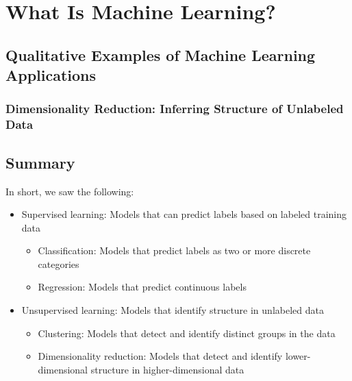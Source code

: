 \chapter{What Is Machine Learning?\label{Ch37}}
\section{Qualitative Examples of Machine Learning Applications}
\subsection*{Dimensionality Reduction: Inferring Structure of Unlabeled Data}
\subsection*{}
\section{Summary}
In short, we saw the following:
\begin{itemize}
    \item Supervised learning: Models that can predict labels based on labeled training data
          \begin{itemize}
              \item Classification: Models that predict labels as two or more discrete categories
              \item Regression: Models that predict continuous labels
          \end{itemize}
    \item Unsupervised learning: Models that identify structure in unlabeled data
          \begin{itemize}
              \item Clustering: Models that detect and identify distinct groups in the data
              \item Dimensionality reduction: Models that detect and identify lower-dimensional structure in higher-dimensional data
          \end{itemize}
\end{itemize}